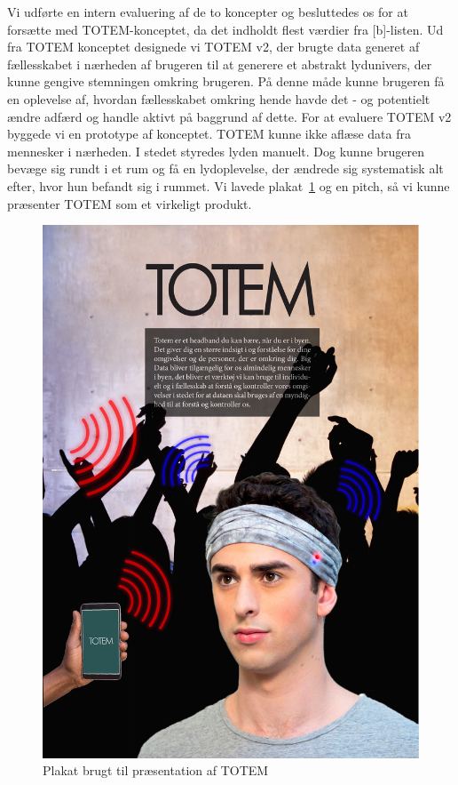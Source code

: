 Vi udførte en intern evaluering af de to koncepter og besluttedes os for at forsætte med TOTEM-konceptet, da det indholdt flest værdier fra [b]-listen. Ud fra TOTEM konceptet designede vi TOTEM v2, der brugte data generet af fællesskabet i nærheden af brugeren til at generere et abstrakt lydunivers, der kunne gengive stemningen omkring brugeren. På denne måde kunne brugeren få en oplevelse af, hvordan fællesskabet omkring hende havde det - og potentielt ændre adfærd og handle aktivt på baggrund af dette. For at evaluere TOTEM v2 byggede vi en prototype af konceptet. TOTEM kunne ikke aflæse data fra mennesker i nærheden. I stedet styredes lyden manuelt. Dog kunne brugeren bevæge sig rundt i et rum og få en lydoplevelse, der ændrede sig systematisk alt efter, hvor hun befandt sig i rummet. Vi lavede plakat~\ref{fig:totemPlakat} og en pitch, så vi kunne præsenter TOTEM som et virkeligt produkt.

\begin{figure}
    \centering
    \includegraphics[width = \textwidth]{Pictures/totemplakat.pdf}
    \caption{Plakat brugt til præsentation af TOTEM}
    \label{fig:totemPlakat}
\end{figure}


